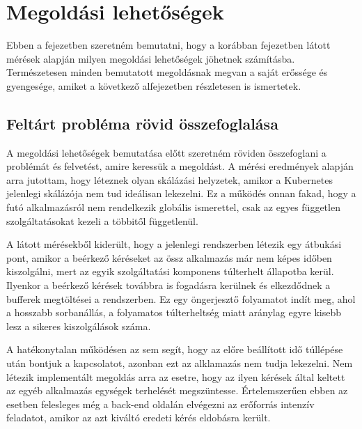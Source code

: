 \chapter{Megoldási lehetőségek}
\label{sec:solutions}

Ebben a fejezetben szeretném bemutatni, hogy a korábban  fejezetben látott mérések alapján milyen megoldási lehetőségek jöhetnek számításba.
Természetesen minden bemutatott megoldásnak megvan a saját erőssége és gyengesége, amiket a következő alfejezetben részletesen is ismertetek.

\section{Feltárt probléma rövid összefoglalása}

A megoldási lehetőségek bemutatása előtt szeretném röviden összefoglani a problémát és felvetést, amire keressük a megoldást.
A mérési eredmények alapján arra jutottam, hogy léteznek olyan skálázási helyzetek, amikor a Kubernetes jelenlegi skálázója nem tud ideálisan lekezelni.
Ez a működés onnan fakad, hogy a futó alkalmazásról nem rendelkezik globális ismerettel, csak az egyes független szolgáltatásokat kezeli a többitől függetlenül.

A látott mérésekből kiderült, hogy a jelenlegi rendszerben létezik egy átbukási pont, amikor a beérkező kéréseket az össz alkalmazás már nem képes időben kiszolgálni, mert az egyik szolgáltatási komponens túlterhelt állapotba kerül.
Ilyenkor a beérkező kérések továbbra is fogadásra kerülnek és elkezdődnek a bufferek megtöltései a rendszerben.
Ez egy öngerjesztő folyamatot indít meg, ahol a hosszabb sorbanállás, a folyamatos túlterheltség miatt aránylag egyre kisebb lesz a sikeres kiszolgálások száma. 

A hatékonytalan működésen az sem segít, hogy az előre beállított idő túllépése után bontjuk a kapcsolatot, azonban ezt az alklamazás nem tudja lekezelni.
Nem létezik implementált megoldás arra az esetre, hogy az ilyen kérések által keltett az egyéb alkalmazás egységek terhelését megszüntesse.
Értelemszerűen ebben az esetben felesleges még a back-end oldalán elvégezni az erőforrás intenzív feladatot, amikor az azt kiváltó eredeti kérés eldobásra került.

